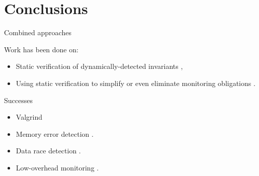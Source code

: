 \documentclass[12pt]{beamer}
\begin{document}

\section{Conclusions}
\label{sec:conc}

\begin{frame}
  \begin{center}

  \end{center}
\end{frame}

\begin{frame}{Combined approaches}

  Work has been done on:

  \begin{itemize}
    \item Static verification of dynamically-detected
      invariants \parencite{statver},

    \item Using static verification to simplify or even eliminate
      monitoring obligations \parencite{unified}.
  \end{itemize}
\end{frame}

\begin{frame}{Successes}

  \begin{itemize}
    \item Valgrind \parencite{valgrind}
    \item Memory error detection \parencite{addrsan}.
    \item Data race detection \parencite{datarace}.
    \item Low-overhead monitoring \parencite{compensate}.
  \end{itemize}
\end{frame}
\end{document}
